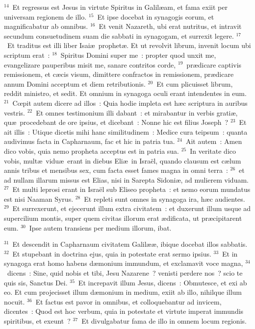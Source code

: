 ${}^{14}$~Et regressus est Jesus in virtute Spiritus in Galil\ae am, et fama exiit per universam regionem de illo.
${}^{15}$~Et ipse docebat in synagogis eorum, et magnificabatur ab omnibus.
${}^{16}$~Et venit Nazareth, ubi erat nutritus, et intravit secundum consuetudinem suam die sabbati in synagogam, et surrexit legere.
${}^{17}$~Et traditus est illi liber Isai\ae\ prophet\ae . Et ut revolvit librum, invenit locum ubi scriptum erat~:
${}^{18}$~Spiritus Domini super me~: propter quod unxit me, evangelizare pauperibus misit me, sanare contritos corde,
${}^{19}$~pr\ae dicare captivis remissionem, et c\ae cis visum, dimittere confractos in remissionem, pr\ae dicare annum Domini acceptum et diem retributionis.
${}^{20}$~Et cum plicuisset librum, reddit ministro, et sedit. Et omnium in synagoga oculi erant intendentes in eum.
${}^{21}$~Cœpit autem dicere ad illos~: Quia hodie impleta est h\ae c scriptura in auribus vestris.
${}^{22}$~Et omnes testimonium illi dabant~: et mirabantur in verbis grati\ae , qu\ae\ procedebant de ore ipsius, et dicebant~: Nonne hic est filius Joseph~?
${}^{23}$~Et ait illis~: Utique dicetis mihi hanc similitudinem~: Medice cura teipsum~: quanta audivimus facta in Capharnaum, fac et hic in patria tua.
${}^{24}$~Ait autem~: Amen dico vobis, quia nemo propheta acceptus est in patria sua.
${}^{25}$~In veritate dico vobis, mult\ae\ vidu\ae\ erant in diebus Eli\ae\ in Isra\"el, quando clausum est c\ae lum annis tribus et mensibus sex, cum facta esset fames magna in omni terra~:
${}^{26}$~et ad nullam illarum missus est Elias, nisi in Sarepta Sidoni\ae , ad mulierem viduam.
${}^{27}$~Et multi leprosi erant in Isra\"el sub Eliseo propheta~: et nemo eorum mundatus est nisi Naaman Syrus.
${}^{28}$~Et repleti sunt omnes in synagoga ira, h\ae c audientes.
${}^{29}$~Et surrexerunt, et ejecerunt illum extra civitatem~: et duxerunt illum usque ad supercilium montis, super quem civitas illorum erat \ae dificata, ut pr\ae cipitarent eum.
${}^{30}$~Ipse autem transiens per medium illorum, ibat.


${}^{31}$~Et descendit in Capharnaum civitatem Galil\ae \ae , ibique docebat illos sabbatis.
${}^{32}$~Et stupebant in doctrina ejus, quia in potestate erat sermo ipsius.
${}^{33}$~Et in synagoga erat homo habens d\ae monium immundum, et exclamavit voce magna,
${}^{34}$~dicens~: Sine, quid nobis et tibi, Jesu Nazarene~? venisti perdere nos~? scio te quis sis, Sanctus Dei.
${}^{35}$~Et increpavit illum Jesus, dicens~: Obmutesce, et exi ab eo. Et cum projecisset illum d\ae monium in medium, exiit ab illo, nihilque illum nocuit.
${}^{36}$~Et factus est pavor in omnibus, et colloquebantur ad invicem, dicentes~: Quod est hoc verbum, quia in potestate et virtute imperat immundis spiritibus, et exeunt~?
${}^{37}$~Et divulgabatur fama de illo in omnem locum regionis.



